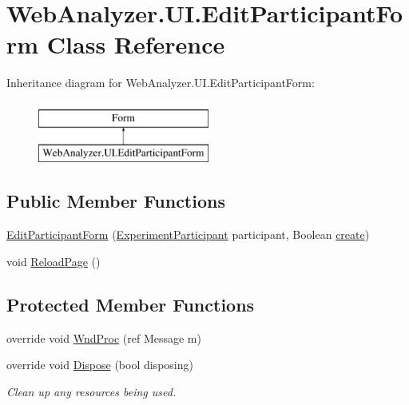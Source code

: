 \hypertarget{class_web_analyzer_1_1_u_i_1_1_edit_participant_form}{}\section{Web\+Analyzer.\+U\+I.\+Edit\+Participant\+Form Class Reference}
\label{class_web_analyzer_1_1_u_i_1_1_edit_participant_form}
Inheritance diagram for Web\+Analyzer.\+U\+I.\+Edit\+Participant\+Form\+:\begin{figure}[H]
\begin{center}
\leavevmode
\includegraphics[height=2.000000cm]{class_web_analyzer_1_1_u_i_1_1_edit_participant_form}
\end{center}
\end{figure}
\subsection*{Public Member Functions}
\begin{DoxyCompactItemize}
\item 
\hyperlink{class_web_analyzer_1_1_u_i_1_1_edit_participant_form_a5b988532c5dfa542239ee3ba825193d6}{Edit\+Participant\+Form} (\hyperlink{class_web_analyzer_1_1_models_1_1_base_1_1_experiment_participant}{Experiment\+Participant} participant, Boolean \hyperlink{_u_i_2_h_t_m_l_resources_2js_2lib_2underscore_8min_8js_a8bd5981157799459d39a59e8c4a0de04}{create})
\item 
void \hyperlink{class_web_analyzer_1_1_u_i_1_1_edit_participant_form_a80f4335016a704ef46b291fa92f1a7d4}{Reload\+Page} ()
\end{DoxyCompactItemize}
\subsection*{Protected Member Functions}
\begin{DoxyCompactItemize}
\item 
override void \hyperlink{class_web_analyzer_1_1_u_i_1_1_edit_participant_form_acc5ebe40ecb86fb98dd6e3c26374d83b}{Wnd\+Proc} (ref Message m)
\item 
override void \hyperlink{class_web_analyzer_1_1_u_i_1_1_edit_participant_form_ab179f939e7a27ea90bddfc33a67335f8}{Dispose} (bool disposing)
\begin{DoxyCompactList}\small\item\em Clean up any resources being used. \end{DoxyCompactList}\end{DoxyCompactItemize}
